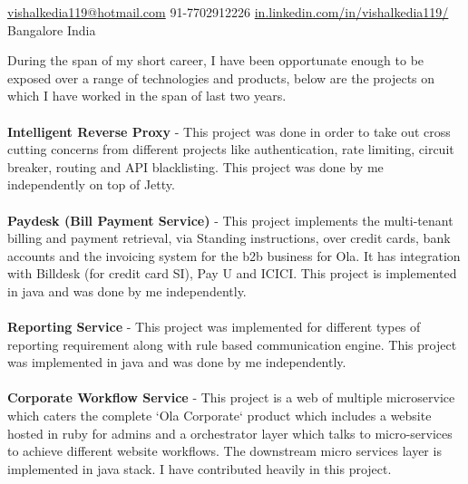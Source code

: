 \documentclass[10pt,a4paper]{article}
\begin{document}
\sloppy  %



\nobreakvspace{0.3em}  %

\noindent\href{mailto:vishalkedia119@hotmail.com}{vishalkedia119\mbox{}@\mbox{}hotmail.com}\sbull
\textsmaller{+}91-7702912226\sbull
\href{http://in.linkedin.com/in/vishalkedia119}{in.linkedin.com/in/vishalkedia119/}
\\
Bangalore\sbull
India

\spacedhrule{0.9em}{-0.4em}  %


\vspace{-1.3em}  %
\begin{multicols}{2}  %
\noindent
During the span of my short career, I have been opportunate enough to be exposed over a range of technologies and products, below are the projects on which I have worked in the span of last two years.
\\
\\
\textbf{Intelligent Reverse Proxy} -  This project was done in order to take out cross cutting concerns from different projects like authentication, rate limiting, circuit breaker, routing and API blacklisting. This project was done by me independently on top of Jetty.
\\
\\
\textbf{Paydesk (Bill Payment Service)} -  This project implements the multi-tenant billing and payment retrieval, via Standing instructions, over credit cards, bank accounts and the invoicing system for the b2b business for Ola. It has integration with Billdesk (for credit card SI), Pay U and ICICI. This project is implemented in java and was done by me independently.
\\
\\
\textbf{Reporting Service} - This project was implemented for different types of reporting requirement along with rule based communication engine. This project was implemented in java and was done by me independently.
\\
\\
\textbf{Corporate Workflow Service} - This project is a web of multiple microservice which caters the complete `Ola Corporate` product which includes a website hosted in ruby for admins and a orchestrator layer which talks to micro-services to achieve different website workflows. The downstream micro services layer is implemented in java stack. I have contributed heavily in this project.
\end{multicols}
\end{document}
